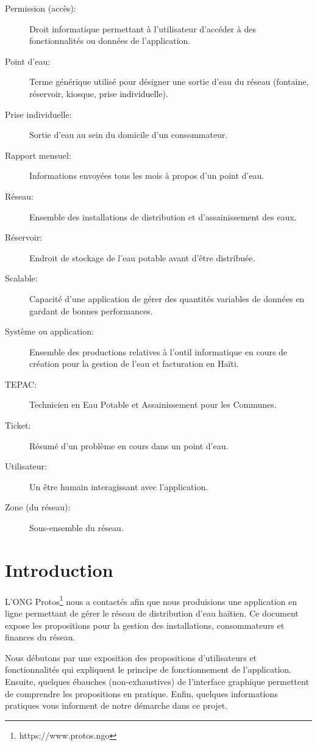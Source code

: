 \documentclass[a4paper, 11pt]{article}
\begin{document}
\begin{description}
    \item[Permission (accès):] Droit informatique permettant à l'utilisateur d'accéder à des fonctionnalités ou données de l'application.
    \item[Point d'eau:] Terme générique utilisé pour désigner une sortie d'eau du réseau (fontaine, réservoir, kiosque, prise individuelle).
    \item[Prise individuelle:] Sortie d'eau au sein du domicile d'un consommateur.
    \item[Rapport mensuel:] Informations envoyées tous les mois à propos d'un point d'eau.
    \item[Réseau:] Ensemble des installations de distribution et d'assainissement des eaux.
    \item[Réservoir:] Endroit de stockage de l'eau potable avant d'être distribuée.
    \item[Scalable:] Capacité d'une application de gérer des quantités variables de données en gardant de bonnes performances.
    \item[Système ou application:] Ensemble des productions relatives à l'outil informatique en cours de création pour la gestion de l'eau et facturation en Haïti.
    \item[TEPAC:] Technicien en Eau Potable et Assainissement pour les Communes.
    \item[Ticket:] Résumé d'un problème en cours dans un point d'eau.
    \item[Utilisateur:] Un être humain interagissant avec l'application.
    \item[Zone (du réseau):] Sous-ensemble du réseau.
  \end{description}
\section{Introduction}

L'ONG Protos\footnote{https://www.protos.ngo} nous a contactés afin que nous produisions une application en ligne permettant de gérer le réseau de distribution d'eau haïtien. Ce document expose les propositions pour la gestion des installations, consommateurs et finances du réseau.

Nous débutons par une exposition des propositions d'utilisateurs et fonctionnalités qui expliquent le principe de fonctionnement de l'application. Ensuite, quelques ébauches (non-exhaustives) de l'interface graphique permettent de comprendre les propositions en pratique. Enfin, quelques informations pratiques vous informent de notre démarche dans ce projet.
\end{document}

